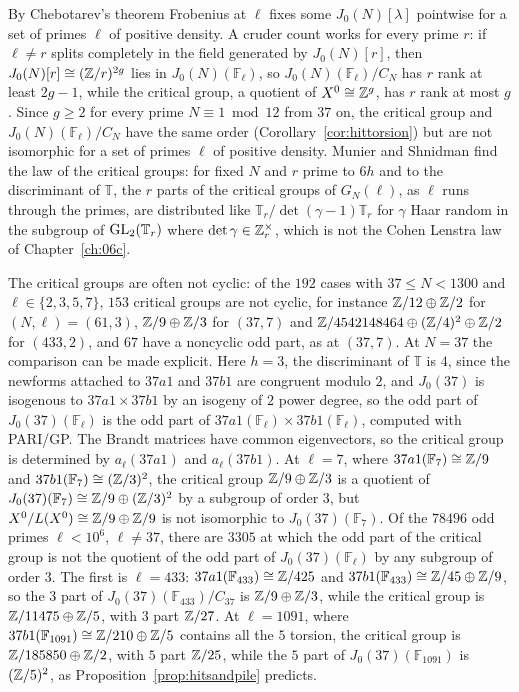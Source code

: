 By Chebotarev's theorem Frobenius at $\ell$ fixes some $J_0(N)[\lambda]$ pointwise for a set of primes $\ell$ of positive density. A cruder count works for every prime $r$: if $\ell\ne r$ splits completely in the field generated by $J_0(N)[r]$, then $J_0(N)[r]\cong(\mathbb{Z}/r)^{2g}$ lies in $J_0(N)(\mathbb F_\ell)$, so $J_0(N)(\mathbb F_\ell)/C_N$ has $r$ rank at least $2g-1$, while the critical group, a quotient of $X^0\cong\mathbb{Z}^g$, has $r$ rank at most $g$. Since $g\ge2$ for every prime $N\equiv1\bmod12$ from $37$ on, the critical group and $J_0(N)(\mathbb F_\ell)/C_N$ have the same order (Corollary~\ref{cor:hittorsion}) but are not isomorphic for a set of primes $\ell$ of positive density. Munier and Shnidman find the law of the critical groups: for fixed $N$ and $r$ prime to $6h$ and to the discriminant of $\mathbb T$, the $r$ parts of the critical groups of $G_N(\ell)$, as $\ell$ runs through the primes, are distributed like $\mathbb T_r/\det(\gamma-1)\mathbb T_r$ for $\gamma$ Haar random in the subgroup of $\mathrm{GL}_2(\mathbb T_r)$ where $\det\gamma\in\mathbb{Z}_r^\times$, which is not the Cohen Lenstra law of Chapter~\ref{ch:06c}.

The critical groups are often not cyclic: of the $192$ cases with $37\le N<1300$ and $\ell\in\{2,3,5,7\}$, $153$ critical groups are not cyclic, for instance $\mathbb{Z}/12\oplus\mathbb{Z}/2$ for $(N,\ell)=(61,3)$, $\mathbb{Z}/9\oplus\mathbb{Z}/3$ for $(37,7)$ and $\mathbb{Z}/4542148464\oplus(\mathbb{Z}/4)^2\oplus\mathbb{Z}/2$ for $(433,2)$, and $67$ have a noncyclic odd part, as at $(37,7)$. At $N=37$ the comparison can be made explicit. Here $h=3$, the discriminant of $\mathbb T$ is $4$, since the newforms attached to $37a1$ and $37b1$ are congruent modulo $2$, and $J_0(37)$ is isogenous to $37a1\times37b1$ by an isogeny of $2$ power degree, so the odd part of $J_0(37)(\mathbb F_\ell)$ is the odd part of $37a1(\mathbb F_\ell)\times37b1(\mathbb F_\ell)$, computed with PARI/GP. The Brandt matrices have common eigenvectors, so the critical group is determined by $a_\ell(37a1)$ and $a_\ell(37b1)$. At $\ell=7$, where $37a1(\mathbb F_7)\cong\mathbb{Z}/9$ and $37b1(\mathbb F_7)\cong(\mathbb{Z}/3)^2$, the critical group $\mathbb{Z}/9\oplus\mathbb{Z}/3$ is a quotient of $J_0(37)(\mathbb F_7)\cong\mathbb{Z}/9\oplus(\mathbb{Z}/3)^2$ by a subgroup of order $3$, but $X^0/L(X^0)\cong\mathbb{Z}/9\oplus\mathbb{Z}/9$ is not isomorphic to $J_0(37)(\mathbb F_7)$. Of the $78496$ odd primes $\ell<10^6$, $\ell\ne37$, there are $3305$ at which the odd part of the critical group is not the quotient of the odd part of $J_0(37)(\mathbb F_\ell)$ by any subgroup of order $3$. The first is $\ell=433$: $37a1(\mathbb F_{433})\cong\mathbb{Z}/425$ and $37b1(\mathbb F_{433})\cong\mathbb{Z}/45\oplus\mathbb{Z}/9$, so the $3$ part of $J_0(37)(\mathbb F_{433})/C_{37}$ is $\mathbb{Z}/9\oplus\mathbb{Z}/3$, while the critical group is $\mathbb{Z}/11475\oplus\mathbb{Z}/5$, with $3$ part $\mathbb{Z}/27$. At $\ell=1091$, where $37b1(\mathbb F_{1091})\cong\mathbb{Z}/210\oplus\mathbb{Z}/5$ contains all the $5$ torsion, the critical group is $\mathbb{Z}/185850\oplus\mathbb{Z}/2$, with $5$ part $\mathbb{Z}/25$, while the $5$ part of $J_0(37)(\mathbb F_{1091})$ is $(\mathbb{Z}/5)^2$, as Proposition~\ref{prop:hitsandpile} predicts.


